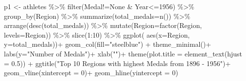 \documentclass[
]{article}
\newenvironment{Shaded}{\begin{snugshade}}{\end{snugshade}}
\newcommand{\AttributeTok}[1]{\textcolor[rgb]{0.77,0.63,0.00}{#1}}
\newcommand{\DecValTok}[1]{\textcolor[rgb]{0.00,0.00,0.81}{#1}}
\newcommand{\FloatTok}[1]{\textcolor[rgb]{0.00,0.00,0.81}{#1}}
\newcommand{\FunctionTok}[1]{\textcolor[rgb]{0.00,0.00,0.00}{#1}}
\newcommand{\NormalTok}[1]{#1}
\newcommand{\OtherTok}[1]{\textcolor[rgb]{0.56,0.35,0.01}{#1}}
\newcommand{\SpecialCharTok}[1]{\textcolor[rgb]{0.00,0.00,0.00}{#1}}
\newcommand{\StringTok}[1]{\textcolor[rgb]{0.31,0.60,0.02}{#1}}
\begin{document}
\begin{Shaded}
\begin{Highlighting}[]
\NormalTok{p1 }\OtherTok{\textless{}{-}}
\NormalTok{athletes }\SpecialCharTok{\%\textgreater{}\%}
    \FunctionTok{filter}\NormalTok{(Medal}\SpecialCharTok{!=}\StringTok{\textquotesingle{}None\textquotesingle{}} \SpecialCharTok{\&}\NormalTok{ Year}\SpecialCharTok{\textless{}=}\DecValTok{1956}\NormalTok{) }\SpecialCharTok{\%\textgreater{}\%}
    \FunctionTok{group\_by}\NormalTok{(Region) }\SpecialCharTok{\%\textgreater{}\%}
    \FunctionTok{summarize}\NormalTok{(}\AttributeTok{total\_medals=}\FunctionTok{n}\NormalTok{()) }\SpecialCharTok{\%\textgreater{}\%}
    \FunctionTok{arrange}\NormalTok{(}\FunctionTok{desc}\NormalTok{(total\_medals))  }\SpecialCharTok{\%\textgreater{}\%}
    \FunctionTok{mutate}\NormalTok{(}\AttributeTok{Region=}\FunctionTok{factor}\NormalTok{(Region, }\AttributeTok{levels=}\NormalTok{Region)) }\SpecialCharTok{\%\textgreater{}\%}
    \FunctionTok{slice}\NormalTok{(}\DecValTok{1}\SpecialCharTok{:}\DecValTok{10}\NormalTok{) }\SpecialCharTok{\%\textgreater{}\%}
    \FunctionTok{ggplot}\NormalTok{( }\FunctionTok{aes}\NormalTok{(}\AttributeTok{x=}\NormalTok{Region, }\AttributeTok{y=}\NormalTok{total\_medals))}\SpecialCharTok{+}
    \FunctionTok{geom\_col}\NormalTok{(}\AttributeTok{fill=}\StringTok{"steelblue"}\NormalTok{) }\SpecialCharTok{+}  
    \FunctionTok{theme\_minimal}\NormalTok{()}\SpecialCharTok{+}
    \FunctionTok{labs}\NormalTok{(}\AttributeTok{y=}\StringTok{"Number of Medals"}\NormalTok{)}\SpecialCharTok{+}
    \FunctionTok{xlab}\NormalTok{(}\StringTok{""}\NormalTok{)}\SpecialCharTok{+}
    \FunctionTok{theme}\NormalTok{(}\AttributeTok{plot.title =} \FunctionTok{element\_text}\NormalTok{(}\AttributeTok{hjust =} \FloatTok{0.5}\NormalTok{)) }\SpecialCharTok{+}
    \FunctionTok{ggtitle}\NormalTok{(}\StringTok{"Top 10 Regions with highest Medals from 1896 {-} 1956"}\NormalTok{)}\SpecialCharTok{+}
    \FunctionTok{geom\_vline}\NormalTok{(}\AttributeTok{xintercept =} \DecValTok{0}\NormalTok{)}\SpecialCharTok{+}
    \FunctionTok{geom\_hline}\NormalTok{(}\AttributeTok{yintercept =} \DecValTok{0}\NormalTok{)}


\end{Highlighting}
\end{Shaded}
\end{document}

